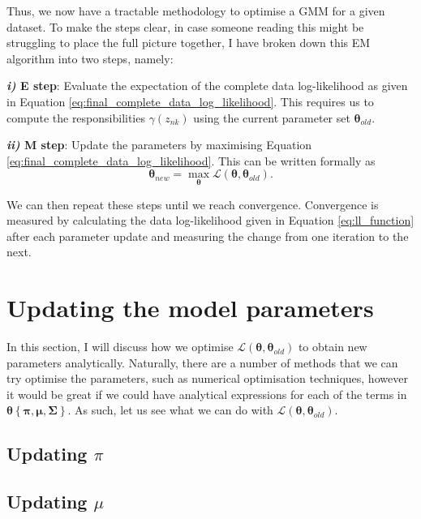 \documentclass{article}
\begin{document}
Thus, we now have a tractable methodology to optimise a GMM for a given dataset. To make the steps clear, in case someone reading this might be struggling to place the full picture together, I have broken down this EM algorithm into two steps, namely:

\textbf{\emph{i)} E step}: Evaluate the expectation of the complete data log-likelihood as given in Equation \eqref{eq:final_complete_data_log_likelihood}. This requires us to compute the responsibilities $\gamma(z_{nk})$ using the current parameter set $\boldsymbol\theta_{old}$.

\bigskip

\textbf{\emph{ii)} M step}: Update the parameters by maximising Equation \eqref{eq:final_complete_data_log_likelihood}. This can be written formally as
\begin{equation}
\boldsymbol\theta_{new} = \max_{\boldsymbol\theta} \mathcal{L}(\boldsymbol\theta, \boldsymbol\theta_{old}).
\end{equation}

We can then repeat these steps until we reach convergence. Convergence is measured by calculating the data log-likelihood given in Equation \eqref{eq:ll_function} after each parameter update and measuring the change from one iteration to the next. 

\section{Updating the model parameters}

In this section, I will discuss how we optimise $\mathcal{L}(\boldsymbol\theta, \boldsymbol\theta_{old})$ to obtain new parameters analytically. Naturally, there are a number of methods that we can try optimise the parameters, such as numerical optimisation techniques, however it would be great if we could have analytical expressions for each of the terms in $\boldsymbol\theta \left\lbrace\boldsymbol\pi, \boldsymbol\mu, \boldsymbol\Sigma \right\rbrace$. As such, let us see what we can do with $\mathcal{L}(\boldsymbol\theta, \boldsymbol\theta_{old})$.

\subsection{Updating $\pi$}

\subsection{Updating $\mu$}
\end{document}
